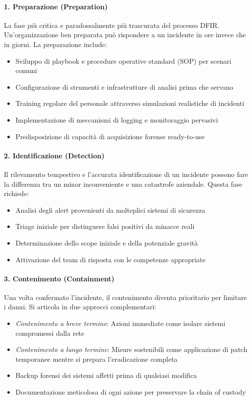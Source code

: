 \paragraph{1. Preparazione (Preparation)}
La fase più critica e paradossalmente più trascurata del processo DFIR. Un'organizzazione ben preparata può rispondere a un incidente in ore invece che in giorni. La preparazione include:
\begin{itemize}
    \item Sviluppo di playbook e procedure operative standard (SOP) per scenari comuni
    \item Configurazione di strumenti e infrastrutture di analisi prima che servano
    \item Training regolare del personale attraverso simulazioni realistiche di incidenti
    \item Implementazione di meccanismi di logging e monitoraggio pervasivi
    \item Predisposizione di capacità di acquisizione forense ready-to-use
\end{itemize}

\paragraph{2. Identificazione (Detection)}
Il rilevamento tempestivo e l'accurata identificazione di un incidente possono fare la differenza tra un minor inconveniente e una catastrofe aziendale. Questa fase richiede:
\begin{itemize}
    \item Analisi degli alert provenienti da molteplici sistemi di sicurezza
    \item Triage iniziale per distinguere falsi positivi da minacce reali
    \item Determinazione dello scope iniziale e della potenziale gravità
    \item Attivazione del team di risposta con le competenze appropriate
\end{itemize}

\paragraph{3. Contenimento (Containment)}
Una volta confermato l'incidente, il contenimento diventa prioritario per limitare i danni. Si articola in due approcci complementari:
\begin{itemize}
    \item \textit{Contenimento a breve termine}: Azioni immediate come isolare sistemi compromessi dalla rete
    \item \textit{Contenimento a lungo termine}: Misure sostenibili come applicazione di patch temporanee mentre si prepara l'eradicazione completa
    \item Backup forensi dei sistemi affetti prima di qualsiasi modifica
    \item Documentazione meticolosa di ogni azione per preservare la chain of custody
\end{itemize}


